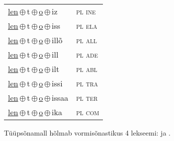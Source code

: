 \begin{minipage}{\textwidth}
\begin{sideways}
\begin{tabular}{l l}
\underline{len}\,$\oplus$\,t\,$\oplus$\,\underline{o}\,$\oplus$\,iz & \textsc{ pl ine } \\
\underline{len}\,$\oplus$\,t\,$\oplus$\,\underline{o}\,$\oplus$\,iss & \textsc{ pl ela } \\
\underline{len}\,$\oplus$\,t\,$\oplus$\,\underline{o}\,$\oplus$\,illõ & \textsc{ pl all } \\
\underline{len}\,$\oplus$\,t\,$\oplus$\,\underline{o}\,$\oplus$\,ill & \textsc{ pl ade } \\
\underline{len}\,$\oplus$\,t\,$\oplus$\,\underline{o}\,$\oplus$\,ilt & \textsc{ pl abl } \\
\underline{len}\,$\oplus$\,t\,$\oplus$\,\underline{o}\,$\oplus$\,issi & \textsc{ pl tra } \\
\underline{len}\,$\oplus$\,t\,$\oplus$\,\underline{o}\,$\oplus$\,issaa & \textsc{ pl ter } \\
\underline{len}\,$\oplus$\,t\,$\oplus$\,\underline{o}\,$\oplus$\,ika & \textsc{ pl com } \\
\end{tabular}
\end{sideways}
\label{tab:tüüpsõnamall-lento}

\end{minipage}

 
\vspace{1em}
\noindent Tüüpsõnamall  hõlmab vormisõnastikus 4 lekseemi:  ja .
